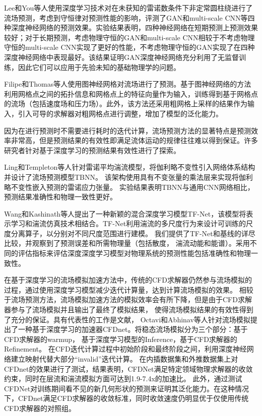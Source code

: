 Lee和You等人\cite{lee2019data}使用深度学习技术对在未获知的雷诺数条件下非定常圆柱绕进行了流场预测，考虑到守恒律对预测性能的影响，评测了GAN和multi-scale CNN等四种深度神经网络的预测效果。实验结果表明，四种神经网络在短期预测上预测效果较好；对于长期预测，考虑物理守恒的GAN和multi-scale CNN相较于不考虑物理守恒的multi-scale CNN实现了更好的性能，不考虑物理守恒的GAN实现了在四种深度神经网络中表现最好。该结果证明GAN深度神经网络充分利用了无监督训练，因此它们可以应用于先验未知的基础物理学的问题。

Filipe和Thomas等人\cite{2020Combining}使用图神经网格对流场进行了预测。基于图神经网络的方法利用网格点之间的拓扑信息和网格点上的特征向量作为输入，训练得到基于网格点的流场（包括速度场和压力场）。此外，该方法还采用粗网格上采样的结果作为输入，引入可导的求解器对粗网格点进行调整，增加了模型的泛化能力。

因为在进行预测时不需要进行耗时的迭代计算，流场预测方法的显著特点是预测效率非常高，但是预测结果的有效性即满足流体运动的规律往往难以得到保证。许多研究者针对基于深度学习的预测结果有效性进行了探索。

Ling和Templeton等人\cite{invariance}针对雷诺平均湍流模型，将伽利略不变性引入网络体系结构并设计了流场预测模型TBNN。
该架构使用具有不变张量的乘法层来实现将伽利略不变性嵌入预测的雷诺应力张量。 
实验结果表明TBNN与通用CNN网络相比，预测结果准确性和物理一致性更好。

Wang和Kashinath\cite{DBLP:journals/nips2019}等人提出了一种新颖的混合深度学习模型TF-Net，该模型将表示学习和湍流仿真技术相结合。TF-Net利用湍流的多尺度行为来设计可训练的尺度分离算子，以分别对不同尺度范围进行建模。 我们提供了TF-Net和基线的详尽比较，并观察到了预测误差和所需物理量（包括散度，
湍流动能和能谱）。采用不同的评估指标来评估深度深度学习模型对物理系统的预测性能包括准确性和物理一致性。


在基于深度学习的流场模拟加速方法中，传统的CFD求解器仍然参与流场模拟的过程，通过使用深度学习模型减少迭代计算量，达到计算流场模拟的效果。
相较于流场预测方法，流场模拟加速方法的模拟效率会有所下降，但是由于CFD求解器参与了流场模拟并且输出了最终了模拟结果，
使得流场模拟结果的有效性得到了充分的保证。具有代表性的工作是文献\cite{cfdnet}，
Octavi和Abhinav等人针对流场模拟提出了一种基于深度学习的加速器CFDnet。将稳态流场模拟分为三个部分：基于CFD求解器的warmup，
基于深度学习模型的Inference，基于CFD求解器的Refinement。
在CFD迭代计算过程中初始阶段和最终阶段之间，利用深度神经网络建立映射代替大部分“invalid”迭代计算。
在内插数据集和外推数据集上对CFDnet的效果进行了测试，结果表明，CFDNet满足特定领域物理求解器的收敛约束，同时在层流和湍流模拟方面可达到1.9-7.4x的加速比。 此外，通过测试CFDNet对训练期间看不见的新几何形状的预测来证明其泛化能力。在这种情况下，CFDnet满足CFD求解器的收敛标准，同时收敛速度仍明显优于仅使用传统CFD求解器的对照组。


